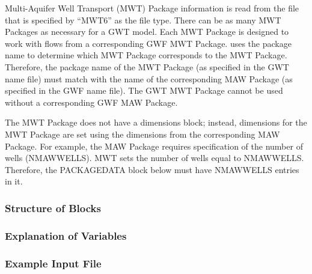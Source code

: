 Multi-Aquifer Well Transport (MWT) Package information is read from the file that is specified by ``MWT6'' as the file type.  There can be as many MWT Packages as necessary for a GWT model. Each MWT Package is designed to work with flows from a corresponding GWF MWT Package. \mf uses the package name to determine which MWT Package corresponds to the MWT Package.  Therefore, the package name of the MWT Package (as specified in the GWT name file) must match with the name of the corresponding MAW Package (as specified in the GWF name file).  The GWT MWT Package cannot be used without a corresponding GWF MAW Package.

The MWT Package does not have a dimensions block; instead, dimensions for the MWT Package are set using the dimensions from the corresponding MAW Package.  For example, the MAW Package requires specification of the number of wells (NMAWWELLS).  MWT sets the number of wells equal to NMAWWELLS.  Therefore, the PACKAGEDATA block below must have NMAWWELLS entries in it.

\vspace{5mm}
\subsubsection{Structure of Blocks}




\vspace{5mm}
\subsubsection{Explanation of Variables}
\begin{description}

\end{description}

\vspace{5mm}
\subsubsection{Example Input File}


\vspace{5mm}
